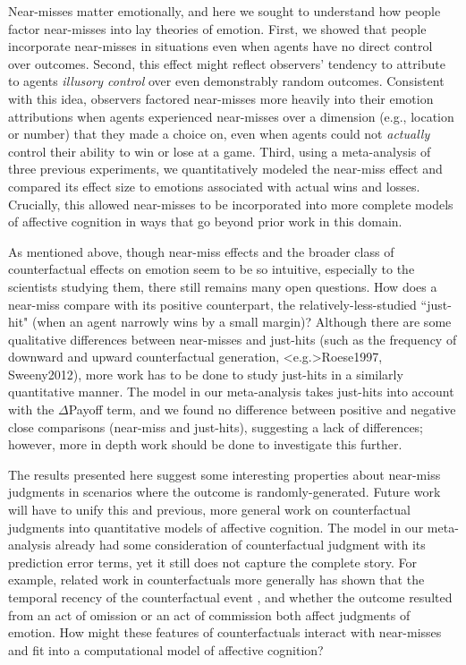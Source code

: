 \documentclass[10pt,letterpaper]{article}
\begin{document}
Near-misses matter emotionally, and here we sought to understand how people factor near-misses into lay theories of emotion. First, we showed that people incorporate near-misses in situations even when agents have no direct control over outcomes. Second, this effect might reflect observers' tendency to attribute to agents \textit{illusory control} over even demonstrably random outcomes.  Consistent with this idea, observers factored near-misses more heavily into their emotion attributions when agents experienced near-misses over a dimension (e.g., location or number) that they made a choice on, even when agents could not \textit{actually} control their ability to win or lose at a game. Third, using a meta-analysis of three previous experiments, we quantitatively modeled the near-miss effect and compared its effect size to emotions associated with actual wins and losses. Crucially, this allowed near-misses to be incorporated into more complete models of affective cognition in ways that go beyond prior work in this domain.


	As mentioned above, though near-miss effects and the broader class of counterfactual effects on emotion seem to be so intuitive, especially to the scientists studying them, there still remains many open questions. How does a near-miss compare with its positive counterpart, the relatively-less-studied ``just-hit" (when an agent narrowly wins by a small margin)? Although there are some qualitative differences between near-misses and just-hits (such as the frequency of downward and upward counterfactual generation, \citeNP<e.g.>{Roese1997, Sweeny2012}), more work has to be done to study just-hits in a similarly quantitative manner. The model in our meta-analysis takes just-hits into account with the $\Delta$Payoff term, and we found no difference between positive and negative close comparisons (near-miss and just-hits), suggesting a lack of differences; however, more in depth work should be done to investigate this further.

	The results presented here suggest some interesting properties about near-miss judgments in scenarios where the outcome is randomly-generated. Future work will have to unify this and previous, more general work on counterfactual judgments into quantitative models of affective cognition. The model in our meta-analysis already had some consideration of counterfactual judgment with its prediction error terms, yet it still does not capture the complete story. For example, related work in counterfactuals more generally has shown that the temporal recency of the counterfactual event \cite{Miller1990}, and whether the outcome resulted from an act of omission or an act of commission \cite{Kahneman1982, Landman1987} both affect judgments of emotion. How might these features of counterfactuals interact with near-misses and fit into a computational model of affective cognition? 
\end{document}

